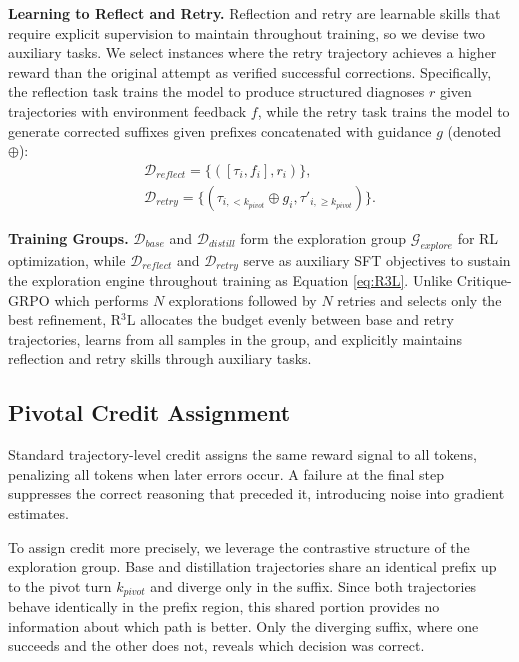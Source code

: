 \documentclass[11pt]{article}
\theoremstyle{definition}
\theoremstyle{remark}
\begin{document}
\textbf{Learning to Reflect and Retry.} Reflection and retry are learnable skills that require explicit supervision to maintain throughout training, so we devise two auxiliary tasks. We select instances where the retry trajectory achieves a higher reward than the original attempt as verified successful corrections. Specifically, the reflection task trains the model to produce structured diagnoses $r$ given trajectories with environment feedback $f$, while the retry task trains the model to generate corrected suffixes given prefixes concatenated with guidance $g$ (denoted $\oplus$):
\begin{equation}
\begin{gathered}
    \mathcal{D}_{reflect} = \{([\tau_i, f_i], r_i)\}, \\
    \mathcal{D}_{retry} = \{(\tau_{i,<k_{pivot}} \oplus g_i, \tau'_{i,\geq k_{pivot}})\}.
\end{gathered}
\end{equation}

\textbf{Training Groups.} $\mathcal{D}_{base}$ and $\mathcal{D}_{distill}$ form the exploration group $\mathcal{G}_{explore}$ for RL optimization, while $\mathcal{D}_{reflect}$ and $\mathcal{D}_{retry}$ serve as auxiliary SFT objectives to sustain the exploration engine throughout training as Equation \ref{eq:R3L}. Unlike Critique-GRPO which performs $N$ explorations followed by $N$ retries and selects only the best refinement, R$^3$L allocates the budget evenly between base and retry trajectories, learns from all samples in the group, and explicitly maintains reflection and retry skills through auxiliary tasks.

\subsection{Pivotal Credit Assignment}
Standard trajectory-level credit assigns the same reward signal to all tokens, penalizing all tokens when later errors occur. A failure at the final step suppresses the correct reasoning that preceded it, introducing noise into gradient estimates.

To assign credit more precisely, we leverage the contrastive structure of the exploration group. Base and distillation trajectories share an identical prefix up to the pivot turn $k_{pivot}$ and diverge only in the suffix. Since both trajectories behave identically in the prefix region, this shared portion provides no information about which path is better. Only the diverging suffix, where one succeeds and the other does not, reveals which decision was correct.
\end{document}

